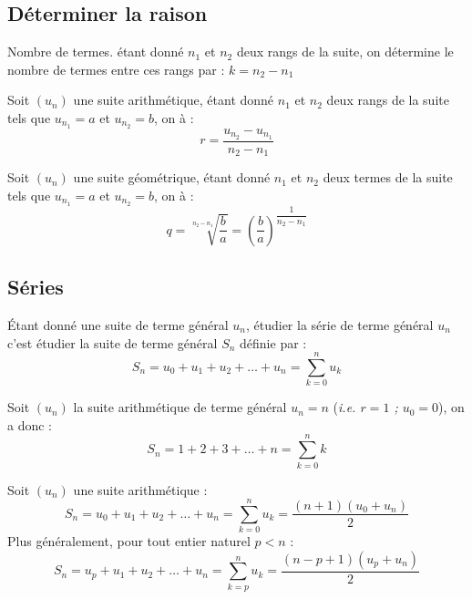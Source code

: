 \documentclass[11pt]{article}
\begin{document}
\subsection{Déterminer la raison}

\begin{definition}{Nombre de termes.}
étant donné $n_1$ et $n_2$ deux rangs de la suite, on détermine le
nombre de termes entre ces rangs par : $k=n_2-n_1$
\end{definition}

\begin{propriete}
Soit $(u_n)$ une suite arithmétique, étant donné $n_1$ et $n_2$ deux
rangs de la suite tels que $u_{n_1}=a$ et $u_{n_2}=b$, on  à :
\[ r = \dfrac{u_{n_2}-u_{n_1}}{n_2-n_1}\]
\end{propriete}

\begin{propriete}
Soit $(u_n)$ une suite géométrique, étant donné $n_1$ et $n_2$ deux
termes de la suite tels que $u_{n_1}=a$ et $u_{n_2}=b$, on  à :
\[ q = \sqrt[n_{2}-n_{1}]{\dfrac{b}{a}} = \left( \dfrac{b}{a} \right)^{\dfrac{1}{n_2-n_1}}\]
\end{propriete}

\subsection{Séries}

\begin{definition}
Étant donné une suite de terme général $u_n$, étudier la série de
terme général $u_n $ c'est étudier la suite de terme général $S_n$
définie par :
\[ S_n = u_0 + u_1 + u_2 + \ldots + u_n = \sum_{k=0}^{n} u_k \]
\end{definition}

\begin{exemple}
Soit $(u_n)$ la suite arithmétique de terme général $u_n=n$
(\textit{i.e. $r=1$ ; $u_0=0$}), on a donc : 
\[ S_n = 1 + 2 + 3 + \ldots + n = \sum_{k=0}^{n} k \]
\end{exemple}

\begin{theoreme}
Soit $(u_n)$ une suite arithmétique :
\[ S_n = u_0 + u_1 + u_2 + \ldots + u_n = \sum_{k=0}^{n} u_k = \dfrac{(n+1)(u_0+u_n)}{2} \]
Plus généralement, pour tout entier naturel $p<n$ :
\[S_n = u_p + u_1 + u_2 + \ldots + u_n = \sum_{k=p}^{n} u_k = \dfrac{(n-p+1)(u_p+u_n)}{2} \]

\end{theoreme}
\end{document}
